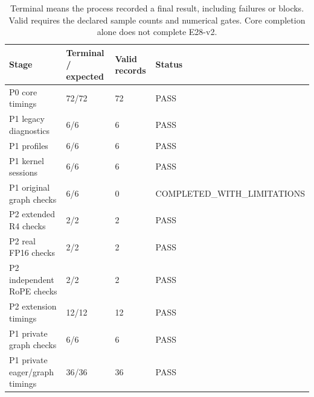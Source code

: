 \begin{table}[t]
\centering
\small
\caption{Terminal means the process recorded a final result, including failures or blocks. Valid requires the declared sample counts and numerical gates. Core completion alone does not complete E28-v2.}
\begin{tabular}{llll}
\toprule
Stage & Terminal / expected & Valid records & Status \\
\midrule
P0 core timings & 72/72 & 72 & PASS \\
P1 legacy diagnostics & 6/6 & 6 & PASS \\
P1 profiles & 6/6 & 6 & PASS \\
P1 kernel sessions & 6/6 & 6 & PASS \\
P1 original graph checks & 6/6 & 0 & COMPLETED\_WITH\_LIMITATIONS \\
P2 extended R4 checks & 2/2 & 2 & PASS \\
P2 real FP16 checks & 2/2 & 2 & PASS \\
P2 independent RoPE checks & 2/2 & 2 & PASS \\
P2 extension timings & 12/12 & 12 & PASS \\
P1 private graph checks & 6/6 & 6 & PASS \\
P1 private eager/graph timings & 36/36 & 36 & PASS \\
\bottomrule
\end{tabular}
\end{table}
